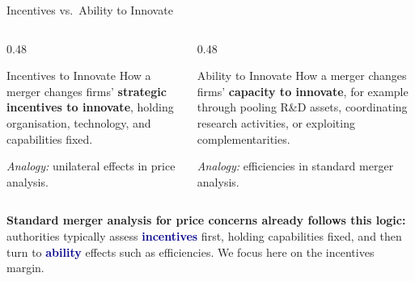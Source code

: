 \documentclass[10pt, aspectratio=169]{beamer}
\newcommand{\highlight}[1]{\textcolor{darkblue}{\textbf{#1}}}
\begin{document}
\begin{frame}{Incentives vs.\ Ability to Innovate}
\small

\begin{columns}[T,onlytextwidth]
\begin{column}{0.48\textwidth}
\begin{block}{Incentives to Innovate}
How a merger changes firms' \textbf{strategic incentives to innovate}, holding organisation, technology, and capabilities fixed.

\vspace{0.35em}
\textit{Analogy:} unilateral effects in price analysis.
\end{block}
\end{column}

\begin{column}{0.48\textwidth}
\begin{block}{Ability to Innovate}
How a merger changes firms' \textbf{capacity to innovate}, for example through pooling R\&D assets, coordinating research activities, or exploiting complementarities.

\vspace{0.35em}
\textit{Analogy:} efficiencies in standard merger analysis.
\end{block}
\end{column}
\end{columns}

\vspace{0.6em}

\begin{center}
\parbox{0.9\textwidth}{\centering
\small
\textbf{Standard merger analysis for price concerns already follows this logic:} authorities typically assess \highlight{incentives} first, holding capabilities fixed, and then turn to \highlight{ability} effects such as efficiencies. We focus here on the incentives margin.
}
\end{center}

\end{frame}
\end{document}
